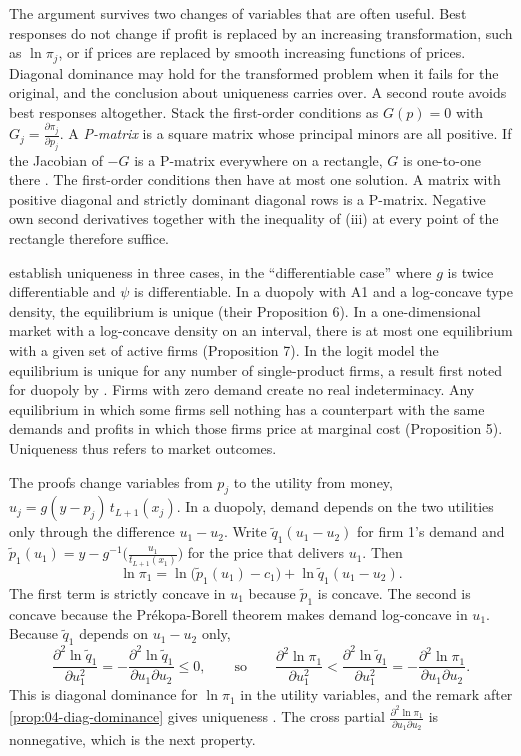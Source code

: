 The argument survives two changes of variables that are often useful. Best responses do not change if profit is
replaced by an increasing transformation, such as $\ln\pi_j$, or if prices are replaced by smooth increasing
functions of prices. Diagonal dominance may hold for the transformed problem when it fails for the original, and
the conclusion about uniqueness carries over. A second route avoids best responses altogether. Stack the
first-order conditions as $G(p) = 0$ with $G_j = \frac{\partial\pi_j}{\partial p_j}$. A \emph{P-matrix} is a square
matrix whose principal minors are all positive. If the Jacobian of $-G$ is a P-matrix everywhere on a rectangle,
$G$ is one-to-one there \citep{GaleNikaido1965}. The first-order conditions then have at most one solution. A matrix with positive diagonal
and strictly dominant diagonal rows is a P-matrix. Negative own second derivatives together with the inequality of (iii) at
every point of the rectangle therefore suffice.

\citet[Section 6]{CaplinNalebuff1991} establish uniqueness in three cases, in the ``differentiable case'' where $g$
is twice differentiable and $\psi$ is differentiable. In a duopoly with A1 and a log-concave type density, the
equilibrium is unique (their Proposition 6). In a one-dimensional market with a log-concave density on an interval,
there is at most one equilibrium with a given set of active firms (Proposition 7). In the logit model the
equilibrium is unique for any number of single-product firms, a result first noted for duopoly by
\citet{AndersonDePalma1988}.
Firms with zero demand create no real indeterminacy. Any equilibrium in which some firms sell nothing has a
counterpart with the same demands and profits in which those firms price at marginal cost (Proposition 5).
Uniqueness thus refers to market outcomes.

The proofs change variables from $p_j$ to the utility from money, $u_j = g(y - p_j)\,t_{L+1}(x_j)$. In a duopoly,
demand depends on the two utilities only through the difference $u_1 - u_2$. Write $\tilde q_1(u_1 - u_2)$ for firm 1's
demand and $\tilde p_1(u_1) = y - g^{-1}\bigl(\frac{u_1}{t_{L+1}(x_1)}\bigr)$ for the price that delivers $u_1$. Then
\[
  \ln\pi_1 = \ln\bigl(\tilde p_1(u_1) - c_1\bigr) + \ln \tilde q_1(u_1 - u_2).
\]
The first term is strictly concave in $u_1$ because $\tilde p_1$ is concave. The second is concave because the
Pr\'ekopa-Borell theorem makes demand log-concave in $u_1$. Because $\tilde q_1$ depends on $u_1 - u_2$ only,
\[
  \frac{\partial^2\ln \tilde q_1}{\partial u_1^2} = -\frac{\partial^2\ln \tilde q_1}{\partial u_1\partial u_2} \le 0,
  \qquad\text{so}\qquad
  \frac{\partial^2\ln\pi_1}{\partial u_1^2} < \frac{\partial^2\ln \tilde q_1}{\partial u_1^2} = -\frac{\partial^2\ln\pi_1}{\partial u_1\partial u_2}.
\]
This is diagonal dominance for $\ln\pi_1$ in the utility variables, and the remark after
\cref{prop:04-diag-dominance} gives uniqueness \citep[p.~30]{CaplinNalebuff1991}. The cross partial
$\frac{\partial^2\ln\pi_1}{\partial u_1\partial u_2}$ is nonnegative, which is the next property.

